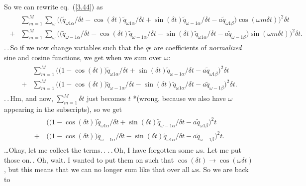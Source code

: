 \documentclass{report}
\begin{document}
So we can rewrite eq.\ (\ref{3.44}) as
\begin{align}
\begin{aligned}
	&\sum_{m=1}^{M} \sum_{\omega}
		\Big( 
			\big(
				\tilde q_{\omega 1\alpha} / \delta t -
				\cos(\delta t) \tilde q_{\omega 1\alpha} / \delta t +
				\sin(\delta t) \tilde q_{\omega-1\alpha} / \delta t -
				a \tilde q_{\omega 1\beta}
			\big)
			\cos(\omega m \delta t) 
		\Big)^2 
		\delta t\\
	+&\sum_{m=1}^{M} \sum_{\omega}
		\Big( 
			\big(
				\tilde q_{\omega-1\alpha} / \delta t -
				\cos(\delta t) \tilde q_{\omega-1\alpha} / \delta t -
				\sin(\delta t) \tilde q_{\omega 1\alpha} / \delta t -
				a \tilde q_{\omega-1\beta}
			\big)
			\sin(\omega m \delta t) 
		\Big)^2 
		\delta t.
\end{aligned}
\end{align}
.\,.\,So if we now change variables such that the $\tilde q$s are coefficients of \emph{normalized} sine and cosine functions, we get when we sum over $\omega$:
\begin{align}
\begin{aligned}
	&\sum_{m=1}^{M} 
		\Big(
			\big(1 - \cos(\delta t)\big) \tilde q_{\omega 1\alpha}  / \delta t +
			\sin(\delta t) \tilde q_{\omega-1\alpha} / \delta t -
			a \tilde q_{\omega 1\beta}
		\Big)^2 
		\delta t\\
	+&\sum_{m=1}^{M} 
		\Big(
			\big(1 - \cos(\delta t)\big) \tilde q_{\omega-1\alpha}  / \delta t -
			\sin(\delta t) \tilde q_{\omega 1\alpha} / \delta t -
			a \tilde q_{\omega-1\beta}
		\Big)^2 
		\delta t.
\end{aligned}
\end{align}
.\,.\,Hm, and now, $\sum_{m=1}^{M} \delta t$ just becomes $t$ *(wrong, because we also have $\omega$ appearing in the subscripts), so we get
\begin{align}
\begin{aligned}
	&\,\Big(
		\big(1 - \cos(\delta t)\big) \tilde q_{\omega 1\alpha}  / \delta t +
		\sin(\delta t) \tilde q_{\omega-1\alpha} / \delta t -
		a \tilde q_{\omega 1\beta}
	\Big)^2 
	t \\
	+&\,\Big(
		\big(1 - \cos(\delta t)\big) \tilde q_{\omega-1\alpha}  / \delta t -
		\sin(\delta t) \tilde q_{\omega 1\alpha} / \delta t -
		a \tilde q_{\omega-1\beta}
	\Big)^2 
	t.
\end{aligned}
\end{align}
\ldots Okay, let me collect the terms.\,. .\,.\,Oh, I have forgotten some $\omega$s. Let me put those on.\,. Oh, wait. I wanted to put them on such that $\cos(\delta t)\to \cos(\omega \delta t)$, but this means that we can no longer sum like that over all $\omega$s. So we are back to
\end{document}
